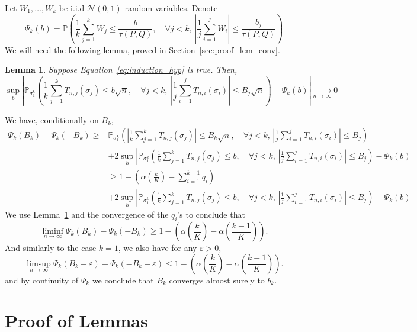 \documentclass{article}
\theoremstyle{plain}
\newtheorem{Lemma}{Lemma}
\theoremstyle{remark}
\renewcommand{\P}{\mathbb{P}}
\newcommand{\1}{\mathbbm{1}}
\newcommand{\todoT}[1]{\todo[inline,color=blue!40]{{\textbf{T:}~}#1}}
\numberwithin{equation}{section}
\begin{document}
Let $W_1,\dots,W_k$ be i.i.d $\mathcal{N}(0,1)$ random variables. Denote
$$\Psi_k(b) = \P\left( \frac{1}{k}\sum_{j=1}^k W_j \le \frac{b}{\tau(P,Q)}, \quad \forall j<k,\, \left|\frac{1}{j}\sum_{i=1}^j W_i\right| \le \frac{b_j}{\tau(P,Q)} \right) $$
We will need the following lemma, proved in Section~\ref{sec:proof_lem_conv}.
\begin{Lemma}\label{lem:convergence_conditional}
Suppose Equation~\eqref{eq:induction_hyp} is true. Then,
$$\sup_{b}\left|\P_{\sigma_1^{k}}\left(\frac{1}{k}\sum_{j=1}^k T_{n,j}\left(\sigma_j\right)\le b \sqrt{n}, \quad \forall j < k,\,  \left|\frac{1}{j}\sum_{i=1}^j T_{n,i}\left(\sigma_i\right)\right|\le  B_j\sqrt{n} \right)-\Psi_k(b) \right|\xrightarrow[n \to \infty]{}0$$
\end{Lemma}
We have, conditionally on $B_k$,
\begin{align*}
\Psi_k(B_k)-\Psi_k(-B_k)\ge&  \P_{\sigma_1^{k}}\left(\left|\frac{1}{k}\sum_{j=1}^k T_{n,j}\left(\sigma_j\right)\right|\le B_k \sqrt{n}, \quad \forall j < k,\,  \left|\frac{1}{j}\sum_{i=1}^j T_{n,i}\left(\sigma_i\right)\right|\le  B_j \right)\\
&+ 2 \sup_{b}\left|\P_{\sigma_1^{k}}\left(\frac{1}{k}\sum_{j=1}^k T_{n,j}\left(\sigma_j\right)\le b , \quad \forall j < k,\,  \left|\frac{1}{j}\sum_{i=1}^j T_{n,i}\left(\sigma_i\right)\right|\le  B_j \right)-\Psi_k(b) \right|\\
&\ge 1-\left(\alpha\left( \frac{k}{K}\right)-\sum_{i=1}^{k-1}q_i\right) \\
&+ 2 \sup_{b}\left|\P_{\sigma_1^{k}}\left(\frac{1}{k}\sum_{j=1}^k T_{n,j}\left(\sigma_j\right)\le b , \quad \forall j < k,\,  \left|\frac{1}{j}\sum_{i=1}^j T_{n,i}\left(\sigma_i\right)\right|\le  B_j \right)-\Psi_k(b) \right|
\end{align*}
We use Lemma~\ref{lem:convergence_conditional} and the convergence of the $q_i$'s to conclude that
$$\liminf_{n \to \infty}\Psi_k(B_k)-\Psi_k(-B_k) \ge 1-\left(\alpha\left( \frac{k}{K}\right)-\alpha\left( \frac{k-1}{K}\right)\right).$$
And similarly to the case $k=1$, we also have for any $\varepsilon>0$,
$$\limsup_{n \to \infty}\Psi_k(B_k+\varepsilon)-\Psi_k(-B_k-\varepsilon) \le  1-\left(\alpha\left( \frac{k}{K}\right)-\alpha\left( \frac{k-1}{K}\right)\right).$$
and by continuity of $\Psi_k$ we conclude that $B_k$ converges almost surely to $b_k$.
\todoT{Check continuity of $\Psi_k$}
\section{Proof of Lemmas}
\end{document}
